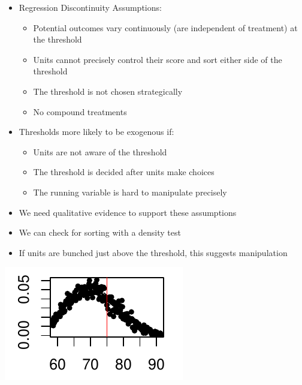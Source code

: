 \documentclass[xcolor=x11names,compress]{beamer}\usepackage[]{graphicx}\usepackage[]{color}
\renewcommand{\(}{\begin{columns}}
\renewcommand{\)}{\end{columns}}
\newcommand{\<}[1]{\begin{column}{#1}}
\renewcommand{\>}{\end{column}}
\begin{document}
\begin{frame}
\begin{itemize}
\item Regression Discontinuity Assumptions:
\begin{itemize}
\item Potential outcomes vary continuously (are independent of treatment) at the threshold
\pause
\item Units cannot precisely control their score and sort either side of the threshold
\pause
\item The threshold is not chosen strategically
\pause
\item No compound treatments
\end{itemize}
\end{itemize}
\end{frame}

\begin{frame}
\begin{itemize}
\item Thresholds more likely to be exogenous if:
\pause
\begin{itemize}
\item Units are not aware of the threshold
\pause
\item The threshold is decided after units make choices
\pause
\item The running variable is hard to manipulate precisely
\pause
\end{itemize}
\item We need qualitative evidence to support these assumptions
\end{itemize}
\end{frame}

\begin{frame}
\begin{itemize}
\item We can check for sorting with a density test
\item If units are bunched just above the threshold, this suggests manipulation
\end{itemize}

\begin{center}
\includegraphics[scale=2]{figure/Density-2.pdf}
\end{center}
\end{frame}
\end{document}

